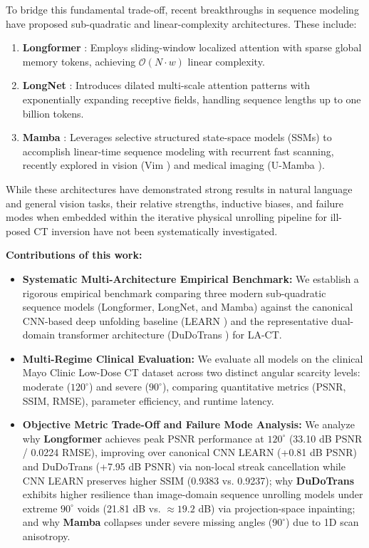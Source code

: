 \documentclass[runningheads]{llncs}
\begin{document}
To bridge this fundamental trade-off, recent breakthroughs in sequence modeling have proposed sub-quadratic and linear-complexity architectures. These include:
\begin{enumerate}
    \item \textbf{Longformer} \cite{beltagy2020longformer}: Employs sliding-window localized attention with sparse global memory tokens, achieving $\mathcal{O}(N \cdot w)$ linear complexity.
    \item \textbf{LongNet} \cite{ding2023longnet}: Introduces dilated multi-scale attention patterns with exponentially expanding receptive fields, handling sequence lengths up to one billion tokens.
    \item \textbf{Mamba} \cite{gu2023mamba,dao2024mamba2}: Leverages selective structured state-space models (SSMs) to accomplish linear-time sequence modeling with recurrent fast scanning, recently explored in vision (Vim \cite{zhu2024visionmamba}) and medical imaging (U-Mamba \cite{ma2024umamba}).
\end{enumerate}

While these architectures have demonstrated strong results in natural language and general vision tasks, their relative strengths, inductive biases, and failure modes when embedded within the iterative physical unrolling pipeline for ill-posed CT inversion have not been systematically investigated.

\noindent \textbf{Contributions of this work:}
\begin{itemize}
    \item \textbf{Systematic Multi-Architecture Empirical Benchmark:} We establish a rigorous empirical benchmark comparing three modern sub-quadratic sequence models (Longformer, LongNet, and Mamba) against the canonical CNN-based deep unfolding baseline (LEARN \cite{chen2018learn}) and the representative dual-domain transformer architecture (DuDoTrans \cite{wang2022dudotrans}) for LA-CT.
    \item \textbf{Multi-Regime Clinical Evaluation:} We evaluate all models on the clinical Mayo Clinic Low-Dose CT dataset across two distinct angular scarcity levels: moderate ($120^\circ$) and severe ($90^\circ$), comparing quantitative metrics (PSNR, SSIM, RMSE), parameter efficiency, and runtime latency.
    \item \textbf{Objective Metric Trade-Off and Failure Mode Analysis:} We analyze why \textbf{Longformer} achieves peak PSNR performance at $120^\circ$ (33.10 dB PSNR / 0.0224 RMSE), improving over canonical CNN LEARN (+0.81 dB PSNR) and DuDoTrans (+7.95 dB PSNR) via non-local streak cancellation while CNN LEARN preserves higher SSIM (0.9383 vs. 0.9237); why \textbf{DuDoTrans} exhibits higher resilience than image-domain sequence unrolling models under extreme $90^\circ$ voids (21.81 dB vs. $\approx 19.2$ dB) via projection-space inpainting; and why \textbf{Mamba} collapses under severe missing angles ($90^\circ$) due to 1D scan anisotropy.
\end{itemize}
\end{document}
